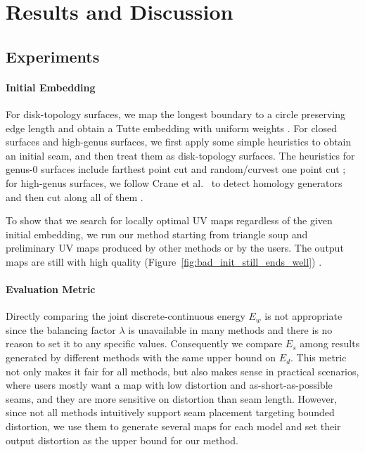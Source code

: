 
\section{Results and Discussion}
\label{sec:results}

\subsection{Experiments}
\label{sec:results_exp}

\paragraph{Initial Embedding} For disk-topology surfaces, we map the longest boundary to a circle preserving edge length and obtain a Tutte embedding with uniform weights . For closed surfaces and high-genus surfaces, we first apply some simple heuristics to obtain an initial seam, and then treat them as disk-topology surfaces.  
The heuristics for genus-0 surfaces include  farthest point cut and random/curvest one point cut ; for high-genus surfaces, we follow Crane et al.~ to detect homology generators and then cut along all of them \minchen{[TODO]}.

To show that we search for locally optimal UV maps regardless of the given initial embedding, we run our method starting from triangle soup and preliminary UV maps produced by other methods or by the users. The output maps are still with high quality (Figure~\ref{fig:bad_init_still_ends_well}) \minchen{[TODO]}.

\paragraph{Evaluation Metric} Directly comparing the joint discrete-continuous energy $E_w$ is not appropriate since the balancing factor $\lambda$ is unavailable in many methods and there is no reason to set it to any specific values. Consequently we compare $E_s$ among results generated by different methods with the same upper bound on $E_d$. This metric not only makes it fair for all methods, but also makes sense in practical scenarios, where users mostly want a map with low distortion and as-short-as-possible seams, and they are more sensitive on distortion than seam length. However, since not all methods intuitively support seam placement targeting bounded distortion, we use them to generate several maps for each model and set their output distortion as the upper bound for our method.

